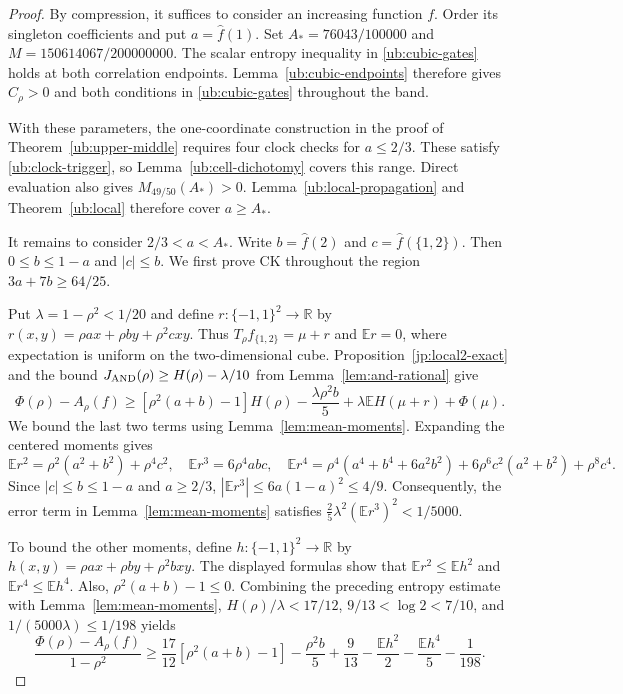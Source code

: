 \documentclass[11pt,letterpaper]{amsart}
\newcommand{\E}{\mathbb E}
\newcommand{\R}{\mathbb R}
\newcommand{\1}{\mathbf 1}
\numberwithin{equation}{section}
\begin{document}
\begin{proof}
By compression, it suffices to consider an increasing function $f$.
Order its singleton coefficients and put $a=\widehat f(1)$.
Set
$A_*=76043/100000$ and $M=150614067/200000000$.
The scalar entropy inequality in \eqref{ub:cubic-gates}
holds at both correlation endpoints.
Lemma~\ref{ub:cubic-endpoints} therefore gives $C_\rho>0$
and both conditions in \eqref{ub:cubic-gates} throughout the band.

With these parameters, the one-coordinate construction in the
proof of Theorem~\ref{ub:upper-middle} requires four clock checks
for $a\le2/3$. These satisfy \eqref{ub:clock-trigger},
so Lemma~\ref{ub:cell-dichotomy} covers this range.
Direct evaluation also gives $M_{49/50}(A_*)>0$.
Lemma~\ref{ub:local-propagation} and Theorem~\ref{ub:local}
therefore cover $a\ge A_*$.

It remains to consider $2/3<a<A_*$.
Write $b=\widehat f(2)$ and $c=\widehat f(\{1,2\})$.
Then $0\le b\le1-a$ and $|c|\le b$.
We first prove CK throughout the region
$3a+7b\ge64/25$.

Put $\lambda=1-\rho^2<1/20$ and define
$r:\{-1,1\}^2\to\R$ by
$r(x,y)=\rho ax+\rho by+\rho^2cxy$.
Thus $T_\rho f_{\{1,2\}}=\mu+r$ and $\E r=0$,
where expectation is uniform on the two-dimensional cube.
Proposition~\ref{jp:local2-exact} and the bound
$J_{\rm AND}(\rho)\ge H(\rho)-\lambda/10$
from Lemma~\ref{lem:and-rational} give
\[
 \Phi(\rho)-A_\rho(f)
 \ge [\rho^2(a+b)-1]H(\rho)-\frac{\lambda\rho^2b}{5}+\lambda\E H(\mu+r)+\Phi(\mu).
\]
We bound the last two terms using
Lemma~\ref{lem:mean-moments}.
Expanding the centered moments gives
\[
 \E r^2=\rho^2(a^2+b^2)+\rho^4c^2, \quad
 \E r^3=6\rho^4abc, \quad
 \E r^4=\rho^4(a^4+b^4+6a^2b^2)
       +6\rho^6c^2(a^2+b^2)+\rho^8c^4.
\]
Since $|c|\le b\le1-a$ and $a\ge2/3$,
$|\E r^3|\le6a(1-a)^2\le4/9$.
Consequently, the error term in Lemma~\ref{lem:mean-moments}
satisfies
$\frac25\lambda^2(\E r^3)^2<1/5000$.

To bound the other moments, define
$h:\{-1,1\}^2\to\R$ by
$h(x,y)=\rho ax+\rho by+\rho^2bxy$.
The displayed formulas show that
$\E r^2\le\E h^2$ and $\E r^4\le\E h^4$.
Also, $\rho^2(a+b)-1\le0$.
Combining the preceding entropy estimate with
Lemma~\ref{lem:mean-moments},
$H(\rho)/\lambda<17/12$,
$9/13<\log2<7/10$, and
$1/(5000\lambda)\le1/198$ yields
\begin{equation}\label{eq:local-moment-polynomial}
 \frac{\Phi(\rho)-A_\rho(f)}{1-\rho^2}
 \ge
 \frac{17}{12}[\rho^2(a+b)-1]-\frac{\rho^2b}{5}+\frac9{13}-\frac{\E h^2}{2}
       -\frac{\E h^4}{5}-\frac1{198}.
\end{equation}


\end{proof}
\end{document}
